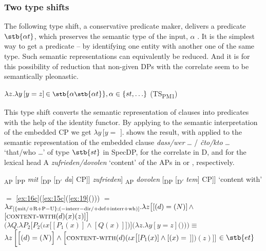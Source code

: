 \documentclass[output=paper,
colorlinks,
citecolor=brown,
newtxmath
]{langscibook}
\begin{document}

\subsubsection{Two type shifts}\label{s:2.4.1}
\label{s:2.4.1.1}

The following type shift, a conservative predicate maker, delivers a predicate $\stb{\alpha t}$, which preserves the semantic type of the input, $\alpha$ \citep{Zimmermann2016b}. It is the simplest way to get a predicate -- by identifying one entity with another one of the same type. Such semantic representations can equivalently be reduced. And it is for this possibility of reduction that non-given DPs with the correlate seem to be semantically pleonastic.

\ea\label{ex:19} $\lambda z . \lambda y \, [y = z] \, {\small \in \stb{\alpha \stb{\alpha t}}, \alpha \in \{st, {\dots} \}}$ \hfill (TS\textsubscript{PM1})
\z

\noindent This type shift converts the semantic representation of clauses into predicates with the help of the identity functor. By applying  to the semantic interpretation of the embedded CP we get $\lambda y \, [y =$ $]$.  shows the result, with  applied to the semantic representation of the embedded clause \textit{dass/wer} {\dots} / \textit{čto/kto} {\dots} `that/who {\dots}' of type $\stb{st}$ in SpecDP,  for the correlate in D, and  for the lexical head A \textit{zufrieden/dovolen} `content' of the APs in  or , respectively.

\ea
\ea {[}\textsubscript{AP} [\textsubscript{PP} \textit{mit} [\textsubscript{DP} [\textsubscript{D$'$} \textit{da}] CP]] \textit{zufrieden}] \label{ex:AP_1}
\ex {[}\textsubscript{AP} \textit{dovolen} [\textsubscript{DP} [\textsubscript{D$'$} \textit{tem}] CP]] \label{ex:AP_2}
\z
%
\glt `content with'
\z

    \begin{doublespace} %

\ea\label{ex:20}  $=$
\ref{ex:16c}\Big(\ref{ex:15c}\big(\ref{ex:19}()\big)\Big) $=$\\
$\lambda x\textsubscript{[\{mit/$+$R$+$P$-$U\};($-$interr$-$dir/$+$def$+$interr$+$wh)]} . \lambda z \big[[(d) = (N)] \, \wedge$ $[\textsc{content-with} (d) (x) (z)]\big] $\newline$ \bigg(\lambda Q . \lambda P_2 \Big[P_2 \big(\iota x \big[[P_1(x)] \wedge [Q (x)]\big]\big)\Big] \Big(\lambda z . \lambda y [y = z] ($$)\Big)\bigg) \equiv $\newline$
\lambda z \, \bigg[\Big[(d) = (N)\Big] \wedge \Big[\textsc{content-with} (d) (\iota x \big[[P_1 (x)] \wedge [(x) =$ $]\big]) (z)\Big]\bigg]$ \newline $\in \stb{et}$
\z

    \end{doublespace}
\end{document}

